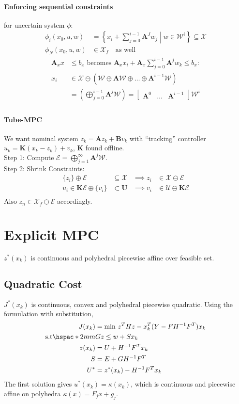\documentclass[landscape,a4paper,8pt]{scrartcl}
\newcommand{\mc}[1]{\mathcal{#1}}
\newcommand\vA{\bm{A}}
\newcommand\vB{\bm{B}}
\newcommand\vK{\bm{K}}
\newcommand\vU{\bm{U}}
\newcommand{\Me}[1]{\begin{bmatrix}#1\end{bmatrix}} %
\begin{document}
\begin{multicols*}{3}
\paragraph{Enforcing sequential constraints} for uncertain system $\phi$:\\
\begin{align*}
\phi_i(x_0, u, w) & = \left\{ x_i + \sum_{j=0}^{i-1}\vA^J w_j \middle| w \in \mc W^i \right\} \subseteq \mc X \\
\phi_N(x_0, u, w) & \in \mc X_f \quad\text{as well}
\end{align*}
\begin{align*}
\vA_x x & \leq b_x \text{ becomes } \vA_x x_i + \vA_x \sum_{j=0}^{i-1}\vA^j w_k \leq b_x: \\
x_i & \in \mc X \ominus \left(\mc W \oplus \vA\mc W \oplus \dots \oplus \vA^{i-1}\mc W\right) \\
    & = \left(\bigoplus_{j=0}^{i-1}\vA^j\mc W\right) = \Me{\vA^0 & \dots & \vA^{i-1}}\mc W^i \\
\end{align*}

\paragraph{Tube-MPC}
We want nominal system $z_k = \vA z_k + \vB v_k$ with ``tracking'' controller $u_k = \vK(x_k - z_k) + v_k$, $\vK$ found offline. \\
Step 1: Compute $\mc E = \bigoplus_{j=1}^\infty \vA^j\mc W.$ \\
Step 2: Shrink Constraints:
\begin{align*}
\{z_i\} \oplus \mc E & \subseteq \mc X & \implies z_i & \in \mc X \ominus \mc E \\
u_i \in \vK\mc E \oplus \{v_i\} & \subset \vU & \implies v_i & \in \mc U \ominus \vK\mc E \\
\end{align*}
Also $z_n \in \mc X_f \ominus \mc E$ accordingly.

\section{Explicit MPC}
$z^*(x_k)$ is continuous and polyhedral piecewise affine over feasible set.
\subsection{Quadratic Cost}
$J^*(x_k)$ is continuous, convex and polyhedral piecewise quadratic.
Using the formulation with substitution,
\begin{align*}
J(x_k) &= \text{min } z^T H z - x_k^T (Y - FH^{-1}F^T )x_k\\
\mathrm{s.t} \hspac*{2mm} & Gz \le w +  Sx_k \\
	z(x_k) &= U + H^{-1} F^T x_k \\
	S &= E + G H^{-1} F^T \\
	U^* &= z^*(x_k) - H^{-1}F^Tx_k
\end{align*}
The first solution gives $u^*(x_k) = \kappa(x_k)$, which is continuous and piecewise affine on polyhedra $\kappa(x) = F_jx + g_j$.

\end{multicols*}
\end{document}
